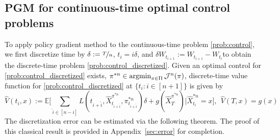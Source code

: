 \documentclass{article}
\numberwithin{equation}{section}
\begin{document}
\subsection{PGM for continuous-time optimal control problems}
 \label{sec:pgm_conti}
To apply policy gradient method to the continuous-time problem \eqref{prob:control},  we first discretize time by $\delta:= \nicefrac{T}{n}$, $t_i=i\delta$, and $\delta W_{t_{i+1}}:=W_{t_{i+1}}-W_{t_{i}}$to obtain the discrete-time problem \eqref{prob:control_discretized}.
Given 
an optimal control for \eqref{prob:control_discretized} exists,    $\pi^{*n} \in\mathop{\text{\normalfont argmin}}_{\pi\in\Uppi}\mathcal{J}^n(\pi)$,
discrete-time value function for \eqref{prob:control_discretized} at $\{t_{i}:i\in[n+1]\}$ is given by
\begin{equation}\label{defn:value_discrete}
    \hat{V}(t_{i},x):=\mathbb{E}\Bigg[\sum_{\hat{i}\in[n-i]}L(t_{i+\hat{i}},\hat{X}^{\pi^{*n}}_{t_{i+\hat{i}}},\pi^{*n}_{t_{i+\hat{i}}})\delta + g(\hat{X}_T^{\pi^{*n}})\bigg|\hat{X}^{*n}_{t_i}=x\Bigg], ~~\hat{V}(T,x)=g(x)
\end{equation}
The discretization error can be estimated via the following theorem. The proof of this classical result is provided in  Appendix~\ref{sec:error} for completion.
\end{document}
